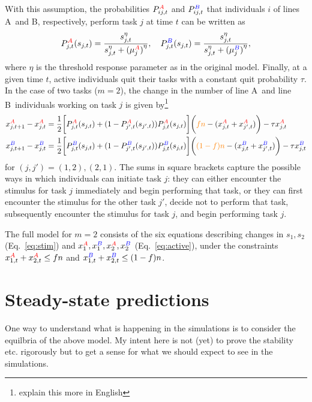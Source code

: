 \documentclass[10pt]{article}
\newcommand{\A}{{\color{red}A}}
\newcommand{\B}{{\color{blue}B}}
\begin{document}
With this assumption, the probabilities $P_{ij,t}^{\A}$ and $P_{ij,t}^{\B}$ that individuals $i$ of lines \A\ and \B, respectively, perform task $j$ at time $t$ can be written as
\begin{equation}
    P_{j,t}^{\A} (s_{j,t}) = \frac{s_{j,t}^\eta}{s_{j,t}^\eta + {(\mu_j^{\A})}^\eta}, \quad P_{j,t}^{\B} (s_{j,t}) = \frac{s_{j,t}^\eta}{s_{j,t}^\eta +{(\mu_j^{\B})}^\eta},
\end{equation}
where $\eta$ is the threshold response parameter as in the original model. Finally, at a given time $t$, active individuals quit their tasks with a constant quit probability $\tau$. In the case of two tasks ($m = 2$), the change in the number of line \A\ and line \B\ individuals working on task $j$ is given by\footnote{explain this more in English}
\begin{align}
    x_{j,t+1}^{\A} - x_{j,t}^{\A} & = \frac{1}{2} \bigg[ P_{j,t}^{\A}(s_{j,t}) + (1 - P_{j',t}^{\A}(s_{j',t}))P_{j,t}^{\A}(s_{j,t})\bigg] \bigg( {\color{orange}fn}
 - (x_{j,t}^{\A} + x_{j',t}^{\A}) \bigg) - \tau x_{j,t}^{\A} \nonumber\\
    x_{j,t+1}^{\B} - x_{j,t}^{\B} & = \frac{1}{2} \bigg[ P_{j,t}^{\B}(s_{j,t}) + (1 - P_{j',t}^{\B}(s_{j',t}))P_{j,t}^{\B}(s_{j,t})\bigg] \bigg( {\color{orange}(1-f)n} - (x_{j,t}^{\B} + x_{j',t}^{\B}) \bigg) - \tau x_{j,t}^{\B} \label{eq:active}
\end{align}
for $(j,j')=(1,2), (2,1)$. {\color{orange}The sums in square brackets capture the possible ways in which individuals can initiate task $j$: they can either encounter the stimulus for task $j$ immediately and begin performing that task, or they can first encounter the stimulus for the other task $j'$, decide not to perform that task, subsequently encounter the stimulus for task $j$, and begin performing task $j$.}

The full model for $m=2$ consists of the six equations describing changes in $s_1, s_2$ (Eq.~\eqref{eq:stim}) and $ x_1^{\A}, x_1^{\B}, x_2^{\A}, x_2^{\B}$ (Eq.~\eqref{eq:active}), {\color{orange}under the constraints $x_{1,t}^{\A}+x_{2,t}^{\A} \leq fn$ and $x_{1,t}^{\B}+ x_{2,t}^{\B} \leq (1-f)n$}.

\section{Steady-state predictions} \label{sec:ss}
One way to understand what is happening in the simulations is to consider the equilbria of the above model. My intent here is not (yet) to prove the stability etc. rigorously but to get a sense for what we should expect to see in the simulations.
\end{document}
